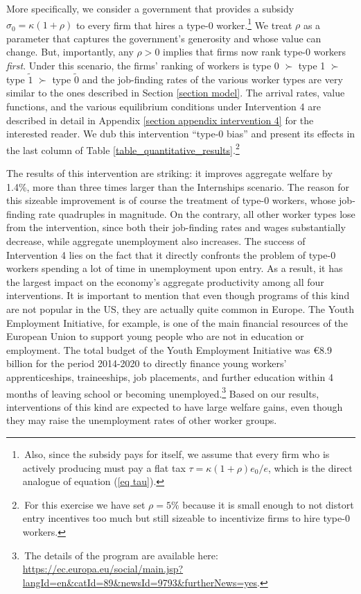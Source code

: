 \documentclass[12pt]{article} %
\theoremstyle{definition}
\begin{document}
More specifically, we consider a government that provides a subsidy $\sigma_0=\kappa(1+\rho)$ to every firm that hires a type-0 worker.\footnote{\,Also, since the subsidy pays for itself, we assume that every firm who is actively producing must pay a flat tax $\tau = \kappa(1+\rho)e_0/e$, which is the direct analogue of equation (\ref{eq tau}).} 
We treat $\rho$ as a parameter that captures the government's generosity and whose value can change. 
But, importantly, any $\rho>0$ implies that firms now rank type-0 workers \textit{first}. 
Under this scenario, the firms' ranking of workers is type $0$ $\succ$ type 1 $\succ$ type $\tilde{1}$ $\succ$ type $\tilde{0}$ and the job-finding rates of the various worker types are very similar to the ones described in Section \ref{section model}. 
The arrival rates, value functions, and the various equilibrium conditions under Intervention 4 are described in detail in Appendix \ref{section appendix intervention 4} for the interested reader. 
We dub this intervention ``type-0 bias'' and present its effects in the last column of Table \ref{table_quantitative_results}.\footnote{\,For this exercise we have set $\rho = 5\%$ because it is small enough to not distort entry incentives too much but still sizeable to incentivize firms to hire type-0 workers.} 

The results of this intervention are striking: it improves aggregate welfare by 1.4\%, more than three times larger than the Internships scenario.
The reason for this sizeable improvement is of course the treatment of type-0 workers, whose job-finding rate quadruples in magnitude.
On the contrary, all other worker types lose from the intervention, since both their job-finding rates and wages substantially decrease, while aggregate unemployment also increases.
The success of Intervention 4 lies on the fact that it directly confronts the problem of type-0 workers spending a lot of time in unemployment upon entry.
As a result, it has the largest impact on the economy's aggregate productivity among all four interventions.
It is important to mention that even though programs of this kind are not popular in the US, they are actually quite common in Europe.
The Youth Employment Initiative, for example, is one of the main financial resources of the European Union to support young people who are not in education or employment.
The total budget of the Youth Employment Initiative was €8.9 billion for the period 2014-2020 to directly finance young workers' apprenticeships, traineeships, job placements, and further education within 4 months of leaving school or becoming unemployed.\footnote{\,The details of the program are available here: \url{https://ec.europa.eu/social/main.jsp?langId=en&catId=89&newsId=9793&furtherNews=yes}.}
Based on our results, interventions of this kind are expected to have large welfare gains, even though they may raise the unemployment rates of other worker groups.
\end{document}
